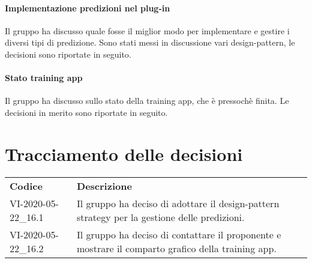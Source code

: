 \documentclass{article}
\begin{document}
\paragraph*{Implementazione predizioni nel plug-in}
Il gruppo ha discusso quale fosse il miglior modo per implementare e gestire i diversi tipi di predizione. Sono stati messi in discussione vari design-pattern, le decisioni sono riportate in seguito.
\paragraph*{Stato training app}
Il gruppo ha discusso sullo stato della training app, che è pressochè finita. Le decisioni in merito sono riportate in seguito.

\section{Tracciamento delle decisioni}
\begin{table}[H]
  \centering
  \begin{tabular}{p{4cm}|p{12cm}}
    \rowcolor{lightgray}
    \textbf{Codice}  & \textbf{Descrizione}      \\
    VI-2020-05-22\_16.1 & Il gruppo ha deciso di adottare il design-pattern strategy per la gestione delle predizioni. \\
    VI-2020-05-22\_16.2 & Il gruppo ha deciso di contattare il proponente e mostrare il comparto grafico della training app.\\
  \end{tabular}
\end{table}
\end{document}

